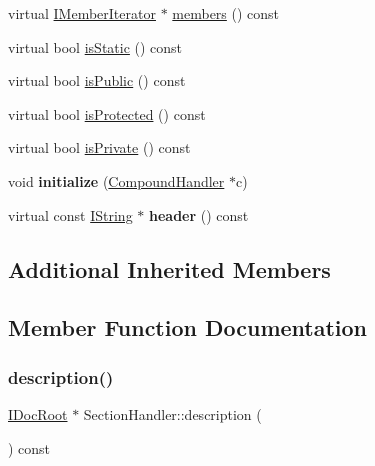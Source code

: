 \begin{DoxyCompactItemize}
\item 
virtual \mbox{\hyperlink{class_i_member_iterator}{I\+Member\+Iterator}} $\ast$ \mbox{\hyperlink{class_section_handler_a6e8854663f76206dfa65428e0bdc5b51}{members}} () const
\item 
virtual bool \mbox{\hyperlink{class_section_handler_a35d5f2bf1c1d2419934e50e370bd5088}{is\+Static}} () const
\item 
virtual bool \mbox{\hyperlink{class_section_handler_aa6e571779cffbb8337fcbc041d486f63}{is\+Public}} () const
\item 
virtual bool \mbox{\hyperlink{class_section_handler_a60e5737210382b9496d9d012cbd56a13}{is\+Protected}} () const
\item 
virtual bool \mbox{\hyperlink{class_section_handler_a9539ef23b026485059539a38f77ba63a}{is\+Private}} () const
\item 
\mbox{\label{class_section_handler_a22632556a3492a9423fccb43d42b95e6}} 
void {\bfseries initialize} (\mbox{\hyperlink{class_compound_handler}{Compound\+Handler}} $\ast$c)
\item 
\mbox{\label{class_section_handler_a7822fc08b5fe89a962300880c0826d3c}} 
virtual const \mbox{\hyperlink{class_i_string}{I\+String}} $\ast$ {\bfseries header} () const
\end{DoxyCompactItemize}
\subsection*{Additional Inherited Members}


\subsection{Member Function Documentation}
\mbox{\label{class_section_handler_a447ecf6bce811a3f12be5e90510aa880}} 
\subsubsection{\texorpdfstring{description()}{description()}}
{\footnotesize\ttfamily \mbox{\hyperlink{class_i_doc_root}{I\+Doc\+Root}} $\ast$ Section\+Handler\+::description (\begin{DoxyParamCaption}{ }\end{DoxyParamCaption}) const\hspace{0.3cm}{\ttfamily [virtual]}}

